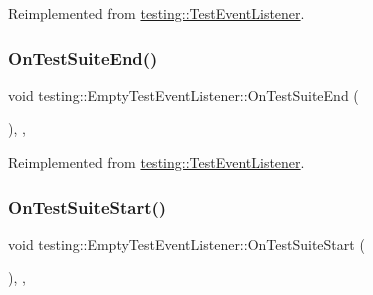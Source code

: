 Reimplemented from \mbox{\hyperlink{classtesting_1_1_test_event_listener_a8962caad5d2522c9160c794074a662ee}{testing\+::\+Test\+Event\+Listener}}.

\mbox{\label{classtesting_1_1_empty_test_event_listener_aefdb73682d290791461e186d864db718}} 
\subsubsection{\texorpdfstring{OnTestSuiteEnd()}{OnTestSuiteEnd()}\hspace{0.1cm}{\footnotesize\ttfamily [2/2]}}
{\footnotesize\ttfamily void testing\+::\+Empty\+Test\+Event\+Listener\+::\+On\+Test\+Suite\+End (\begin{DoxyParamCaption}\item[{const \mbox{\hyperlink{classtesting_1_1_test_suite}{Test\+Suite}} \&}]{ }\end{DoxyParamCaption})\hspace{0.3cm}{\ttfamily [inline]}, {\ttfamily [override]}, {\ttfamily [virtual]}}



Reimplemented from \mbox{\hyperlink{classtesting_1_1_test_event_listener_a8962caad5d2522c9160c794074a662ee}{testing\+::\+Test\+Event\+Listener}}.

\mbox{\label{classtesting_1_1_empty_test_event_listener_a1e32e4bd4857822b6b50e6900aa5c651}} 
\subsubsection{\texorpdfstring{OnTestSuiteStart()}{OnTestSuiteStart()}\hspace{0.1cm}{\footnotesize\ttfamily [1/2]}}
{\footnotesize\ttfamily void testing\+::\+Empty\+Test\+Event\+Listener\+::\+On\+Test\+Suite\+Start (\begin{DoxyParamCaption}\item[{const \mbox{\hyperlink{classtesting_1_1_test_suite}{Test\+Suite}} \&}]{ }\end{DoxyParamCaption})\hspace{0.3cm}{\ttfamily [inline]}, {\ttfamily [override]}, {\ttfamily [virtual]}}



